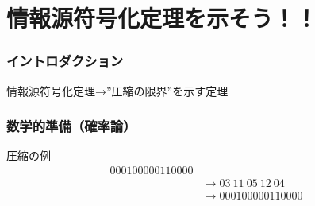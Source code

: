 \documentclass{classes/myslide}
\begin{document}
\section{情報源符号化定理を示そう！！}

\begin{frame}\frametitle{イントロダクション}
  情報源符号化定理→”圧縮の限界”を示す定理


\end{frame}

\begin{frame}\frametitle{数学的準備（確率論）}
  \begin{exampleblock}{圧縮の例}
    \begin{align*}
      000100000110000 \\
      &\rightarrow 03 \ 11 \ 05 \ 12 \ 04 \\
      &\rightarrow 000100000110000 
    \end{align*}
  \end{exampleblock}
\end{frame}
\end{document}
